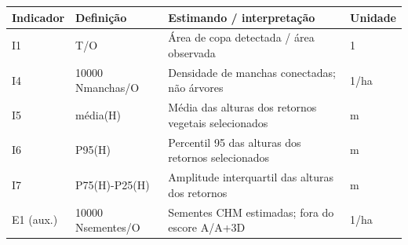 \begin{tabular}{llll}
\hline
Indicador & Definição & Estimando / interpretação & Unidade \\
\hline
I1 & T/O & Área de copa detectada / área observada & 1 \\
I4 & 10000 Nmanchas/O & Densidade de manchas conectadas; não árvores & 1/ha \\
I5 & média(H) & Média das alturas dos retornos vegetais selecionados & m \\
I6 & P95(H) & Percentil 95 das alturas dos retornos selecionados & m \\
I7 & P75(H)-P25(H) & Amplitude interquartil das alturas dos retornos & m \\
E1 (aux.) & 10000 Nsementes/O & Sementes CHM estimadas; fora do escore A/A+3D & 1/ha \\
\hline
\end{tabular}
